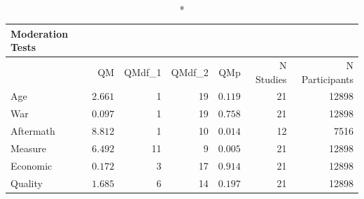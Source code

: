 \documentclass[
  letterpaper,
  DIV=11,
  numbers=noendperiod]{scrartcl}
\begin{document}
\begin{longtable*}{l|rrrrrr}
\caption*{
{\large Moderation Tests}
} \\ 
\toprule
{} & QM & QMdf\_1 & QMdf\_2 & QMp & N Studies & N Participants \\ 
\midrule\addlinespace[2.5pt]
Age & $2.661$ & 1 & 19 & $0.119$ & 21 & 12898 \\ 
War & $0.097$ & 1 & 19 & $0.758$ & 21 & 12898 \\ 
Aftermath & $8.812$ & 1 & 10 & $0.014$ & 12 & 7516 \\ 
Measure & $6.492$ & 11 & 9 & $0.005$ & 21 & 12898 \\ 
Economic & $0.172$ & 3 & 17 & $0.914$ & 21 & 12898 \\ 
Quality & $1.685$ & 6 & 14 & $0.197$ & 21 & 12898 \\ 
\bottomrule
\end{longtable*}
\end{document}

